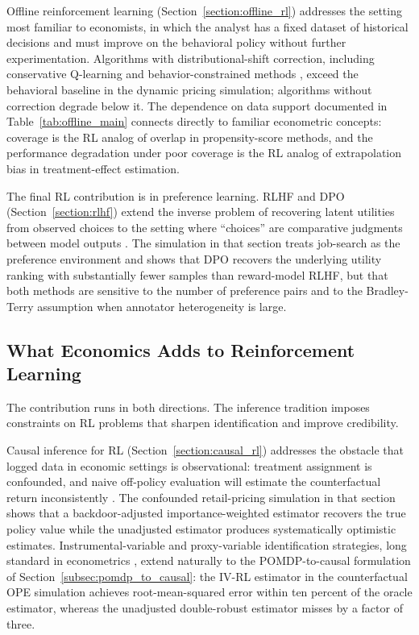 Offline reinforcement learning (Section~\ref{section:offline_rl}) addresses the setting most familiar to economists, in which the analyst has a fixed dataset of historical decisions and must improve on the behavioral policy without further experimentation.
Algorithms with distributional-shift correction, including conservative Q-learning \citep{Kumar2020} and behavior-constrained methods \citep{Fujimoto2019b}, exceed the behavioral baseline in the dynamic pricing simulation; algorithms without correction degrade below it.
The dependence on data support documented in Table~\ref{tab:offline_main} connects directly to familiar econometric concepts: coverage is the RL analog of overlap in propensity-score methods, and the performance degradation under poor coverage is the RL analog of extrapolation bias in treatment-effect estimation.

The final RL contribution is in preference learning.
RLHF and DPO (Section~\ref{section:rlhf}) extend the inverse problem of recovering latent utilities from observed choices to the setting where ``choices'' are comparative judgments between model outputs \citep{christiano:2017, ouyang2022training, rafailov2023direct}.
The simulation in that section treats job-search as the preference environment and shows that DPO recovers the underlying utility ranking with substantially fewer samples than reward-model RLHF, but that both methods are sensitive to the number of preference pairs and to the Bradley-Terry assumption when annotator heterogeneity is large.

\subsection{What Economics Adds to Reinforcement Learning}

The contribution runs in both directions.
The inference tradition imposes constraints on RL problems that sharpen identification and improve credibility.

Causal inference for RL (Section~\ref{section:causal_rl}) addresses the obstacle that logged data in economic settings is observational: treatment assignment is confounded, and naive off-policy evaluation will estimate the counterfactual return inconsistently \citep{precup2000, pearl2009causality}.
The confounded retail-pricing simulation in that section shows that a backdoor-adjusted importance-weighted estimator recovers the true policy value while the unadjusted estimator produces systematically optimistic estimates.
Instrumental-variable and proxy-variable identification strategies, long standard in econometrics \citep{robins1994estimation}, extend naturally to the POMDP-to-causal formulation of Section~\ref{subsec:pomdp_to_causal}: the IV-RL estimator in the counterfactual OPE simulation achieves root-mean-squared error within ten percent of the oracle estimator, whereas the unadjusted double-robust estimator misses by a factor of three.

